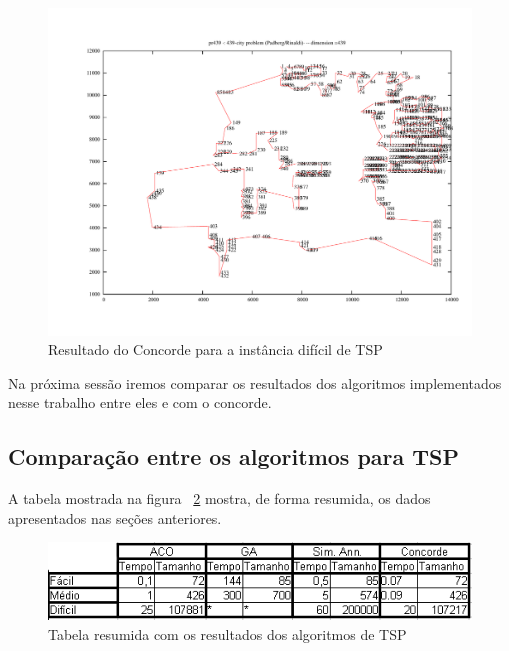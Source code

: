 \documentclass{acm_proc_article-sp}
\begin{document}
\begin{figure}[ht]
 \begin{center}
  \includegraphics[scale=0.3]{imagens/dificil_concorde.pdf} 
  \caption{Resultado do Concorde para a instância difícil de TSP}
  \label{fig:dificil-concorde}
 \end{center}
\end{figure}

Na próxima sessão iremos comparar os resultados dos algoritmos implementados nesse trabalho entre eles e com o concorde.

\subsection{Comparação entre os algoritmos para TSP}

A tabela mostrada na figura ~\ref{fig:tabela1} mostra, de forma resumida, os dados apresentados nas seções anteriores.

\begin{figure}[ht]
 \begin{center}
  \includegraphics[scale=0.5]{imagens/tabela.png}
  \caption{Tabela resumida com os resultados dos algoritmos de TSP}
  \label{fig:tabela1}
 \end{center}
\end{figure}
\end{document}
